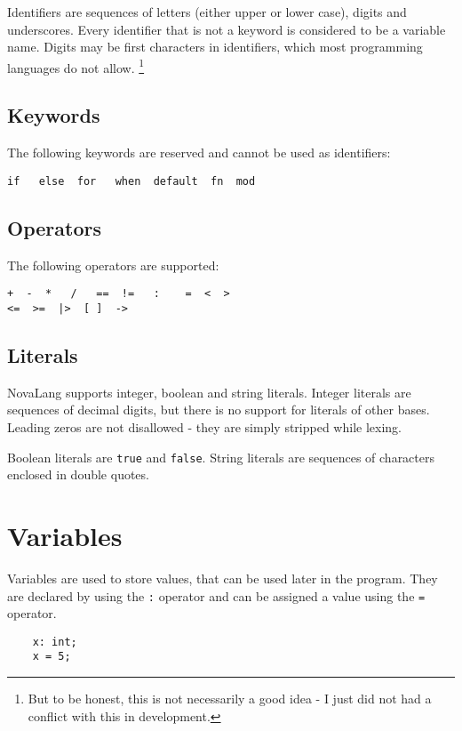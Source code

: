 \documentclass[conference]{IEEEtran}
\begin{document}
Identifiers are sequences of letters (either upper or lower case), digits and underscores.
Every identifier that is not a keyword is considered to be a variable name.
Digits may be first characters in identifiers, which most programming languages do not allow. \footnote{But to be honest, this is not necessarily a good idea - I just did not had a conflict with this in development.}

\subsection{Keywords}

The following keywords are reserved and cannot be used as identifiers:
\begin{verbatim}
if   else  for   when  default  fn  mod
\end{verbatim}

\subsection{Operators}

The following operators are supported:
\begin{verbatim}
+  -  *   /   ==  !=   :    =  <  >
<=  >=  |>  [ ]  ->
\end{verbatim}

\subsection{Literals}

NovaLang supports integer, boolean and string literals.
Integer literals are sequences of decimal digits, but there is no support for literals of other bases.
Leading zeros are not disallowed - they are simply stripped while lexing.

Boolean literals are \texttt{true} and \texttt{false}.
String literals are sequences of characters enclosed in double quotes.

\section{Variables}

Variables are used to store values, that can be used later in the program.
They are declared by using the \texttt{:} operator and can be assigned a value using the \texttt{=} operator.

\begin{lstlisting}
    x: int;
    x = 5;
\end{lstlisting}
\end{document}

